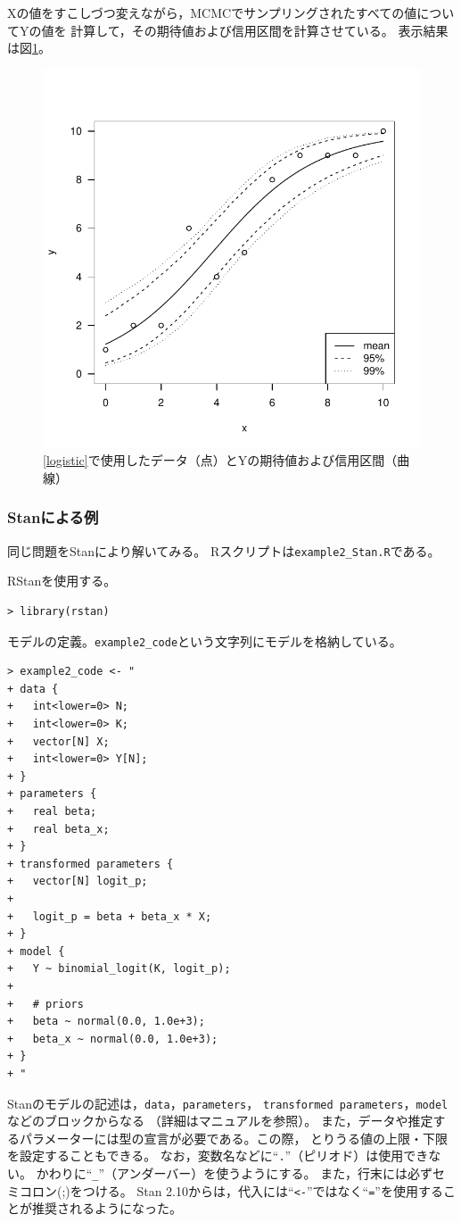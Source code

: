\documentclass[11pt,uplatex]{jsarticle}
\begin{document}
Xの値をすこしづつ変えながら，MCMCでサンプリングされたすべての値についてYの値を
計算して，その期待値および信用区間を計算させている。
表示結果は図\ref{example2exp_plot}。
\begin{figure}[htbp]
  \begin{center}
    \includegraphics[bb=0 0 360 360, clip, width=240 bp]{example2_exp.pdf}
  \end{center}
  \caption{\ref{logistic}で使用したデータ（点）とYの期待値および信用区間（曲線）}
  \label{example2exp_plot}
\end{figure}


\subsubsection{Stanによる例}
同じ問題を\textsf{Stan}により解いてみる。
\textsf{R}スクリプトは\texttt{example2\_Stan.R}である。

RStanを使用する。
\begin{lstlisting}
> library(rstan)
\end{lstlisting}

モデルの定義。\texttt{example2\_code}という文字列にモデルを格納している。
\begin{lstlisting}
> example2_code <- "
+ data {
+   int<lower=0> N;
+   int<lower=0> K;
+   vector[N] X;
+   int<lower=0> Y[N];
+ }
+ parameters {
+   real beta;
+   real beta_x;
+ }
+ transformed parameters {
+   vector[N] logit_p;
+ 
+   logit_p = beta + beta_x * X;
+ }
+ model {
+   Y ~ binomial_logit(K, logit_p);
+   
+   # priors
+   beta ~ normal(0.0, 1.0e+3);
+   beta_x ~ normal(0.0, 1.0e+3);
+ }
+ "
\end{lstlisting}
\noindent
Stanのモデルの記述は，\texttt{data}，\texttt{parameters}，
\texttt{transformed parameters}，\texttt{model}などのブロックからなる
（詳細はマニュアルを参照）。
また，データや推定するパラメーターには型の宣言が必要である。この際，
とりうる値の上限・下限を設定することもできる。
なお，変数名などに``\texttt{.}''（ピリオド）は使用できない。
かわりに``\texttt{\_}''（アンダーバー）を使うようにする。
また，行末には必ずセミコロン(;)をつける。
Stan 2.10からは，代入には``\texttt{<-}''ではなく``\texttt{=}''を使用することが推奨されるようになった。
\end{document}

